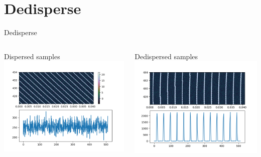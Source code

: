 \documentclass{beamer}
\begin{document}
\section{Dedisperse}
\begin{frame}{Dedisperse}
	\begin{columns}
		\begin{column}{0.5\textwidth}
			Dispersed samples
			\includegraphics[width=\columnwidth]{dispersed_samples}
		\end{column}
		\begin{column}{0.5\textwidth}
			Dedispersed samples
			\includegraphics[width=\columnwidth]{dedispersed_samples}
		\end{column}
	\end{columns}
\end{frame}
\end{document}
